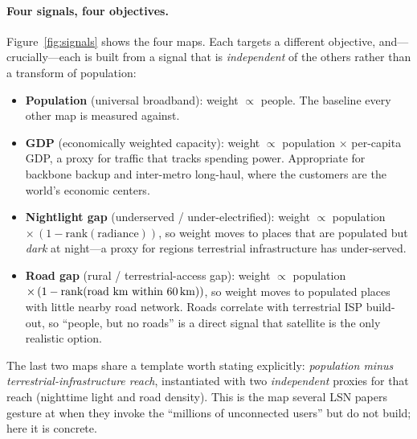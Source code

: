 \paragraph{Four signals, four objectives.}
Figure~\ref{fig:signals} shows the four maps. Each targets a different
objective, and---crucially---each is built from a signal that is
\emph{independent} of the others rather than a transform of population:

\begin{itemize}[leftmargin=1.2em,itemsep=1pt]
  \item \textbf{Population} (universal broadband): weight $\propto$ people.
        The baseline every other map is measured against.
  \item \textbf{GDP} (economically weighted capacity): weight $\propto$
        population $\times$ per-capita GDP, a proxy for traffic that tracks
        spending power. Appropriate for backbone backup and inter-metro
        long-haul, where the customers are the world's economic centers.
  \item \textbf{Nightlight gap} (underserved / under-electrified): weight
        $\propto$ population $\times\,(1-\text{rank}(\text{radiance}))$, so
        weight moves to places that are populated but \emph{dark} at
        night---a proxy for regions terrestrial infrastructure has
        under-served.
  \item \textbf{Road gap} (rural / terrestrial-access gap): weight
        $\propto$ population $\times\,(1-\text{rank}(\text{road km within
        60\,km}))$, so weight moves to populated places with little nearby
        road network. Roads correlate with terrestrial ISP build-out, so
        ``people, but no roads'' is a direct signal that satellite is the
        only realistic option.
\end{itemize}

The last two maps share a template worth stating explicitly:
\emph{population minus terrestrial-infrastructure reach}, instantiated with
two \emph{independent} proxies for that reach (nighttime light and road
density). This is the map several LSN papers gesture at when they invoke the
``millions of unconnected users'' but do not build; here it is concrete.

